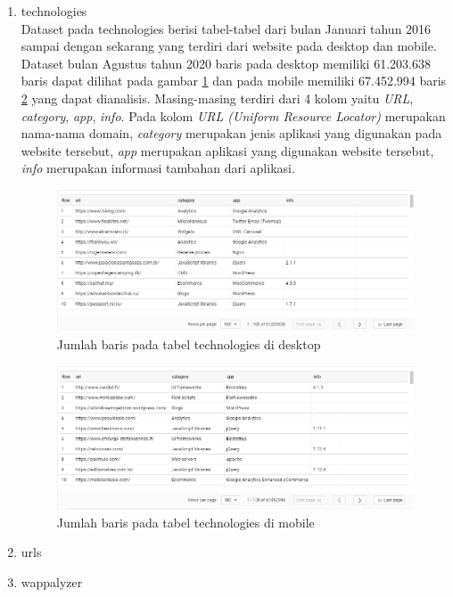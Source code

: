 \begin{enumerate}
	\item technologies\\
	Dataset pada technologies berisi tabel-tabel dari bulan Januari tahun 2016 sampai dengan sekarang yang terdiri dari website pada desktop dan mobile. Dataset bulan Agustus tahun 2020 baris pada desktop memiliki 61.203.638 baris  dapat dilihat pada gambar \ref{fig:ct_tech_desktop} dan pada mobile memiliki 67.452.994 baris \ref{fig:ct_tech_mobile} yang dapat dianalisis. Masing-masing terdiri dari 4 kolom yaitu \textit{URL}, \textit{category}, \textit{app}, \textit{info}. Pada kolom \textit{URL (Uniform Resource Locator)} merupakan nama-nama domain, \textit{category} merupakan jenis aplikasi yang digunakan pada website tersebut, \textit{app} merupakan aplikasi yang digunakan website tersebut, \textit{info} merupakan informasi tambahan dari aplikasi. 
	
	\begin{figure}[H]
		\centering  
		\includegraphics[scale=0.9]{Gambar/2020_08_01_desktop_jumlah_baris.PNG}  
		\caption{Jumlah baris pada tabel technologies di desktop} 
		\label{fig:ct_tech_desktop} 
	\end{figure}
	
	\begin{figure}[H]
		\centering  
		\includegraphics[scale=0.9]{Gambar/2020_08_01_mobile_jumlah_baris.PNG}  
		\caption{Jumlah baris pada tabel technologies di mobile} 
		\label{fig:ct_tech_mobile} 
	\end{figure}
	
	\item urls\\
	\item wappalyzer\\
\end{enumerate}


